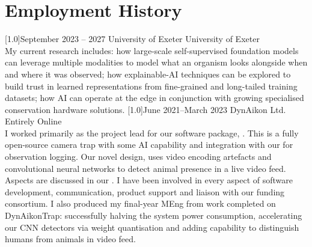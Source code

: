 \documentclass[a4paper]{cv-style}     %
\begin{document}
\section{Employment History}
  \vspace{-0.4cm}
  
\begin{entrylist}
\entry
{\scalebox{.8}[1.0]{September 2023 -- 2027}}
  {University of Exeter}
  {University of Exeter}
  {\\
  My current research includes: how large-scale self-supervised foundation models can leverage multiple modalities to model what an organism looks alongside when and where it was observed; how explainable-AI techniques can be explored to build trust in learned representations from fine-grained and long-tailed training datasets; how AI can operate at the edge in conjunction with growing specialised conservation hardware solutions.
  }
\entry
  {\scalebox{.8}[1.0]{June 2021--March 2023}}
  {DynAikon Ltd.}
  {Entirely Online}
  {\\
  I worked primarily as the project lead for our software package, . This is a fully open-source camera trap with some AI capability and integration with our  for observation logging. Our novel design, uses video encoding artefacts and convolutional neural networks to detect animal presence in a live video feed. Aspects are discussed in our . I have been involved in every aspect of software development, communication, product support and liaison with our funding consortium. I also produced my final-year MEng  from work completed on DynAikonTrap: successfully halving the system power consumption, accelerating our CNN detectors via weight quantisation and adding capability to distinguish humans from animals in video feed. 
}
\end{entrylist}
\end{document}

